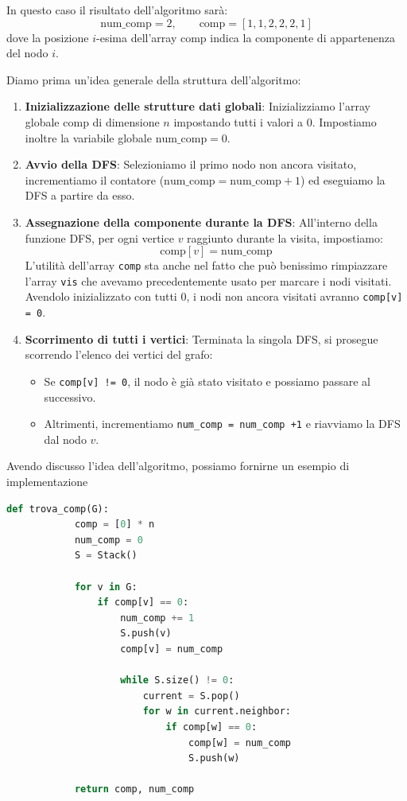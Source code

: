 \documentclass[12pt]{report}
\begin{document}
	In questo caso il risultato dell'algoritmo sarà:
	\[
	\text{num\_comp} = 2, \qquad \text{comp} = [1, 1, 2, 2, 2, 1]
	\]
	dove la posizione $i$-esima dell'array $\text{comp}$ indica la componente di appartenenza del nodo $i$.
	
	Diamo prima un'idea generale della struttura dell'algoritmo:	
	\begin{enumerate}
		\item \textbf{Inizializzazione delle strutture dati globali}:
		Inizializziamo l'array globale $\text{comp}$ di dimensione $n$ impostando tutti i valori a $0$. Impostiamo inoltre la variabile globale $\text{num\_comp} = 0$.
		
		\item \textbf{Avvio della DFS}:
		Selezioniamo il primo nodo non ancora visitato, incrementiamo il contatore ($\text{num\_comp} = \text{num\_comp} + 1$) ed eseguiamo la DFS a partire da esso.
		
		\item \textbf{Assegnazione della componente durante la DFS}:
		All'interno della funzione DFS, per ogni vertice $v$ raggiunto durante la visita, impostiamo:
		\[
		\text{comp}[v] = \text{num\_comp}
		\]
		L'utilità dell'array \texttt{comp} sta anche nel fatto che può benissimo rimpiazzare l'array \texttt{vis} che avevamo precedentemente usato per marcare i nodi visitati. Avendolo inizializzato con tutti 0, i nodi non ancora visitati avranno \texttt{comp[v] = 0}.
		
		\item \textbf{Scorrimento di tutti i vertici}:
		Terminata la singola DFS, si prosegue scorrendo l'elenco dei vertici del grafo:
		\begin{itemize}
			\item Se \texttt{comp[v] != 0}, il nodo è già stato visitato e possiamo passare al successivo.
			\item Altrimenti, incrementiamo \texttt{num\_comp = num\_comp +1} e riavviamo la DFS dal nodo $v$.
		\end{itemize}
	\end{enumerate}
	
	Avendo discusso l'idea dell'algoritmo, possiamo fornirne un esempio di implementazione
	\begin{lstlisting}[style=stile-listings, language=Python]
		def trova_comp(G):
			comp = [0] * n
			num_comp = 0
			S = Stack()
			
			for v in G:
				if comp[v] == 0:
					num_comp += 1
					S.push(v)
					comp[v] = num_comp
			
					while S.size() != 0:
						current = S.pop()
						for w in current.neighbor:
							if comp[w] == 0:
								comp[w] = num_comp
								S.push(w)
			
			return comp, num_comp
	\end{lstlisting}
	
\end{document}

